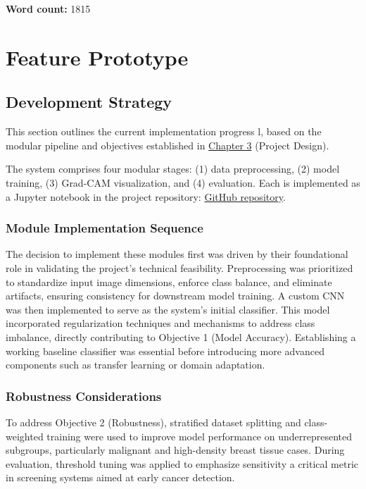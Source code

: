 \documentclass[12pt]{article}
\begin{document}
\vspace{2em}
\noindent\textbf{Word count:} 1815

\newpage
\section{Feature Prototype}
\subsection{Development Strategy}

This section outlines the current implementation progress l, based on the modular pipeline and objectives established in \hyperref[chapter3]{Chapter 3} (Project Design).

The system comprises four modular stages: (1) data preprocessing, (2) model training, (3) Grad-CAM visualization, and (4) evaluation. Each is implemented as a Jupyter notebook in the project repository: \href{https://github.com/justinlim00/FYP-Overview25/tree/main/FYP%20Project/FYP%20Project%20Code%20V1/notebooks}{GitHub repository}.

\subsubsection{Module Implementation Sequence}
The decision to implement these modules first was driven by their foundational role in validating the project’s technical feasibility. Preprocessing was prioritized to standardize input image dimensions, enforce class balance, and eliminate artifacts, ensuring consistency for downstream model training. A custom CNN was then implemented to serve as the system’s initial classifier. This model incorporated regularization techniques and mechanisms to address class imbalance, directly contributing to Objective 1 (Model Accuracy). Establishing a working baseline classifier was essential before introducing more advanced components such as transfer learning or domain adaptation.

\subsubsection{Robustness Considerations}
To address Objective 2 (Robustness), stratified dataset splitting and class-weighted training were used to improve model performance on underrepresented subgroups, particularly malignant and high-density breast tissue cases. During evaluation, threshold tuning was applied to emphasize sensitivity a critical metric in screening systems aimed at early cancer detection.
\end{document}
